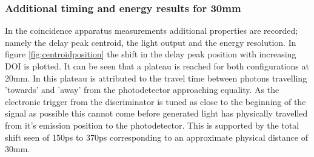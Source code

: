 \subsubsection{Additional timing and energy results for 30mm}
In the coincidence apparatus measurements additional properties are recorded; namely the delay peak centroid, the light output and the energy resolution. In figure \ref{fig:centroidposition} the shift in the delay peak position with increasing DOI is plotted. It can be seen that a plateau is reached for both configurations at 20mm. In \cite{Moses_Derenzo_1999} this plateau is attributed to the travel time between photons travelling 'towards' and 'away' from the photodetector approaching equality. As the electronic trigger from the discriminator is tuned as close to the beginning of the signal as possible this cannot come before generated light has physically travelled from it's emission position to the photodetector. This is supported by the total shift seen of 150ps to 370ps corresponding to an approximate physical distance of 30mm.
